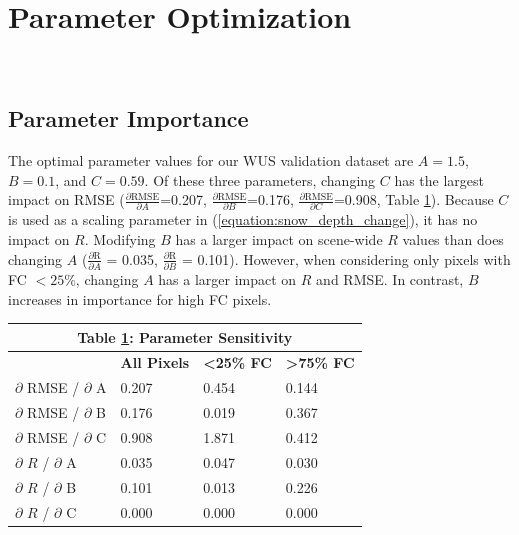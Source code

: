 \documentclass[journal abbreviation, manuscript]{copernicus}
\begin{document}
\section{Parameter Optimization}~\label{appendix:optimization}

\subsection{Parameter Importance}

The optimal parameter values for our WUS validation dataset are $A=1.5$, $B=0.1$, and $C=0.59$. Of these three parameters, changing $C$ has the largest impact on RMSE ($\frac{\partial \text{RMSE}}{\partial A}$=0.207, $\frac{\partial \text{RMSE}}{\partial B}$=0.176, $\frac{\partial \text{RMSE}}{\partial C}$=0.908, Table \ref{table:parameters}). Because $C$ is used as a scaling parameter in (\ref{equation:snow_depth_change}), it has no impact on $R$. Modifying $B$ has a larger impact on scene-wide $R$ values than does changing $A$ ($\frac{\partial \text{R}}{\partial A}$ = 0.035, $\frac{\partial \text{R}}{\partial B}$ = 0.101). However, when considering only pixels with FC $<25 \%$, changing $A$ has a larger impact on $R$ and RMSE. In contrast, $B$ increases in importance for high FC pixels.  

\begin{table}[htbp]
\label{table:parameters}
\begin{tabular}{|l|l|l|l|}
\hline
\multicolumn{4}{|c|}{\textbf{Table \ref{table:parameters}: Parameter Sensitivity}} \\
\hline
& \textbf{All Pixels} & \textbf{\textless{}25\% FC} & \textbf{\textgreater{}75\% FC} \\
\hline
$\partial$ RMSE / $\partial$ A & 0.207 & 0.454 & 0.144 \\
$\partial$ RMSE / $\partial$ B & 0.176 & 0.019 & 0.367 \\
$\partial$ RMSE / $\partial$ C & 0.908 & 1.871 & 0.412 \\ \hline
$\partial$ $R$  / $\partial$ A & 0.035 & 0.047 & 0.030 \\
$\partial$ $R$  / $\partial$ B & 0.101 & 0.013 & 0.226 \\
$\partial$ $R$  / $\partial$ C & 0.000 & 0.000 & 0.000 \\
\hline
\end{tabular}
\end{table}
\end{document}

